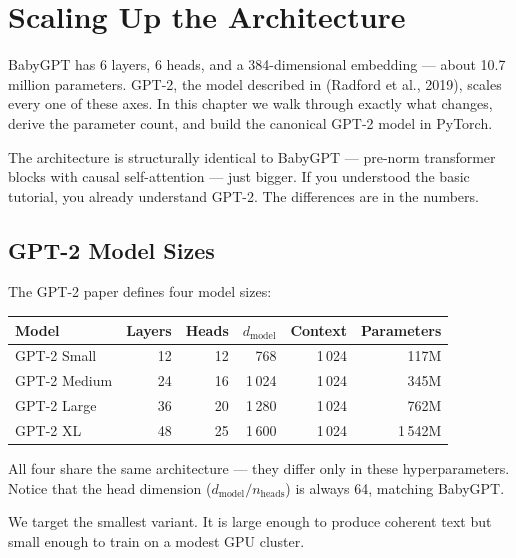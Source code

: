 \chapter{Scaling Up the Architecture}
\label{ch:scaling}

BabyGPT has 6 layers, 6 heads, and a 384-dimensional embedding --- about 10.7 million parameters.  GPT-2, the model described in  (Radford et al., 2019), scales every one of these axes.  In this chapter we walk through exactly what changes, derive the parameter count, and build the canonical GPT-2 model in PyTorch.

The architecture is structurally identical to BabyGPT --- pre-norm transformer blocks with causal self-attention --- just bigger.  If you understood the basic tutorial, you already understand GPT-2.  The differences are in the numbers.


\section{GPT-2 Model Sizes}

The GPT-2 paper defines four model sizes:

\begin{center}
\begin{tabular}{lrrrrr}
\toprule
Model & Layers & Heads & $d_{\text{model}}$ & Context & Parameters \\
\midrule
GPT-2 Small  & 12 & 12 & 768   & 1\,024 & 117M \\
GPT-2 Medium & 24 & 16 & 1\,024 & 1\,024 & 345M \\
GPT-2 Large  & 36 & 20 & 1\,280 & 1\,024 & 762M \\
GPT-2 XL     & 48 & 25 & 1\,600 & 1\,024 & 1\,542M \\
\bottomrule
\end{tabular}
\end{center}

All four share the same architecture --- they differ only in these hyperparameters.  Notice that the head dimension ($d_{\text{model}} / n_{\text{heads}}$) is always 64, matching BabyGPT.

We target the smallest variant.  It is large enough to produce coherent text but small enough to train on a modest GPU cluster.



